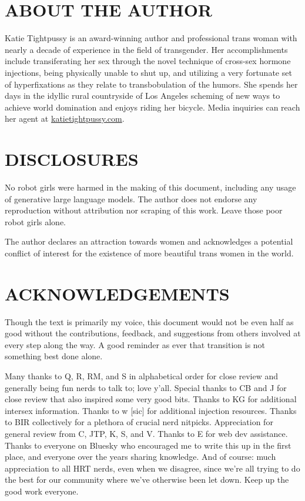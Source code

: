 \documentclass{article}
\begin{document}
\section*{ABOUT THE AUTHOR}

Katie Tightpussy is an award-winning author and professional trans woman with nearly a decade of experience in the field of transgender. Her accomplishments include transiferating her sex through the novel technique of cross-sex hormone injections, being physically unable to shut up, and utilizing a very fortunate set of hyperfixations as they relate to transbobulation of the humors. She spends her days in the idyllic rural countryside of Los Angeles scheming of new ways to achieve world domination and enjoys riding her bicycle. Media inquiries can reach her agent at \href{http://katietightpussy.com}{katietightpussy.com}.

 

\section*{DISCLOSURES}

No robot girls were harmed in the making of this document, including any usage of generative large language models. The author does not endorse any reproduction without attribution nor scraping of this work. Leave those poor robot girls alone.

The author declares an attraction towards women and acknowledges a potential conflict of interest for the existence of more beautiful trans women in the world.

 

\section*{ACKNOWLEDGEMENTS}

Though the text is primarily my voice, this document would not be even half as good without the contributions, feedback, and suggestions from others involved at every step along the way. A good reminder as ever that transition is not something best done alone.

Many thanks to Q, R, RM, and S in alphabetical order for close review and generally being fun nerds to talk to; love y’all. Special thanks to CB and J for close review that also inspired some very good bits. Thanks to KG for additional intersex information. Thanks to w [sic] for additional injection resources. Thanks to BIR collectively for a plethora of crucial nerd nitpicks. Appreciation for general review from C, JTP, K, S, and V. Thanks to E for web dev assistance. Thanks to everyone on Bluesky who encouraged me to write this up in the first place, and everyone over the years sharing knowledge. And of course: much appreciation to all HRT nerds, even when we disagree, since we’re all trying to do the best for our community where we’ve otherwise been let down. Keep up the good work everyone. 
\end{document}
